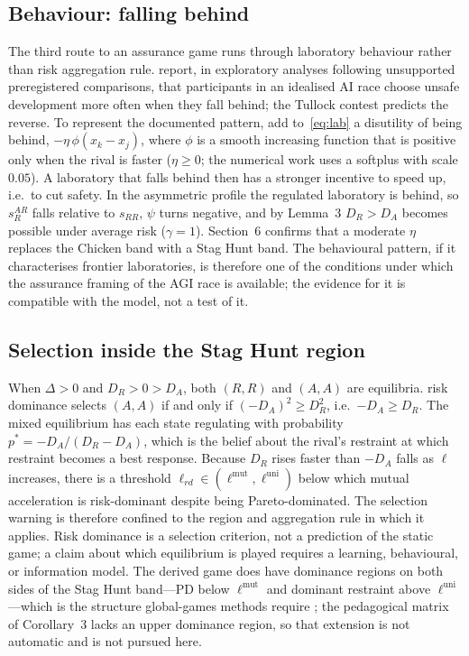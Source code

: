 \documentclass[11pt]{article}
\theoremstyle{plain}
\theoremstyle{definition}
\theoremstyle{remark}
\newcommand{\Delt}{\Delta}
\begin{document}
\subsection{Behaviour: falling behind}

The third route to an assurance game runs through laboratory behaviour rather than risk aggregation rule. \citet{fernandez2026} report, in exploratory analyses following unsupported preregistered comparisons, that participants in an idealised AI race choose unsafe development more often when they fall behind; the Tullock contest predicts the reverse. To represent the documented pattern, add to~\eqref{eq:lab} a disutility of being behind, $-\eta\,\phi(x_k-x_j)$, where $\phi$ is a smooth increasing function that is positive only when the rival is faster ($\eta\ge0$; the numerical work uses a softplus with scale $0.05$). A laboratory that falls behind then has a stronger incentive to speed up, i.e.\ to cut safety. In the asymmetric profile the regulated laboratory is behind, so $s^{AR}_R$ falls relative to $s_{RR}$, $\psi$ turns negative, and by Lemma~3 $D_R>D_A$ becomes possible under average risk ($\gamma=1$). Section~6 confirms that a moderate $\eta$ replaces the Chicken band with a Stag Hunt band. The behavioural pattern, if it characterises frontier laboratories, is therefore one of the conditions under which the assurance framing of the AGI race is available; the evidence for it is compatible with the model, not a test of it.

\subsection{Selection inside the Stag Hunt region}

When $\Delt>0$ and $D_R>0>D_A$, both $(R,R)$ and $(A,A)$ are equilibria. \citet{harsanyi1988} risk dominance selects $(A,A)$ if and only if $(-D_A)^2\ge D_R^2$, i.e.\ $-D_A\ge D_R$. The mixed equilibrium has each state regulating with probability $p^*=-D_A/(D_R-D_A)$, which is the belief about the rival's restraint at which restraint becomes a best response. Because $D_R$ rises faster than $-D_A$ falls as $\ell$ increases, there is a threshold $\ell_{rd}\in(\ell^{\mathrm{mut}},\ell^{\mathrm{uni}})$ below which mutual acceleration is risk-dominant despite being Pareto-dominated. The selection warning is therefore confined to the region and aggregation rule in which it applies. Risk dominance is a selection criterion, not a prediction of the static game; a claim about which equilibrium is played requires a learning, behavioural, or information model. The derived game does have dominance regions on both sides of the Stag Hunt band---PD below $\ell^{\mathrm{mut}}$ and dominant restraint above $\ell^{\mathrm{uni}}$---which is the structure global-games methods require \citep{carlsson1993}; the pedagogical matrix of Corollary~3 lacks an upper dominance region, so that extension is not automatic and is not pursued here.
\end{document}
